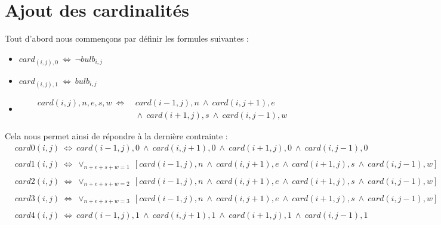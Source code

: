 \documentclass{article}
\begin{document}
\section{Ajout des cardinalit\'es}

Tout d'abord nous commen\c{c}ons par d\'efinir les formules suivantes :
\begin{itemize}
\item $ card_{(i,j),0} ~ \Leftrightarrow ~ \neg bulb_{i,j} $
\item $ card_{(i,j),1} ~ \Leftrightarrow ~ bulb_{i,j} $
\item 
\begin{align}
\nonumber card(i,j),n,e,s,w ~ \Leftrightarrow &~card(i-1,j),n ~ \wedge ~ card(i,j+1),e
\\ 
\nonumber
&~ \wedge ~ card(i+1,j),s ~ \wedge ~ card(i,j-1),w 
\end{align}
\end{itemize}
Cela nous permet ainsi de r\'epondre \`a la derni\`ere contrainte :
\begin{align}
\nonumber
&card0(i,j) ~ \Leftrightarrow ~ card(i-1,j),0 ~ \wedge ~ card(i,j+1),0~ \wedge ~ card(i+1,j),0 ~ \wedge ~ card(i,j-1),0\\
\nonumber
\\
\nonumber
&card1(i,j) ~ \Leftrightarrow ~ \vee_{n+e+s+w = 1} ~ [card(i-1,j),n ~ \wedge ~ card(i,j+1),e ~ \wedge ~ card(i+1,j),s ~ \wedge ~ card(i,j-1),w]\\
\nonumber
\\
\nonumber
&card2(i,j) ~ \Leftrightarrow ~ \vee_{n+e+s+w = 2} ~ [card(i-1,j),n ~ \wedge ~ card(i,j+1),e~ \wedge ~ card(i+1,j),s ~ \wedge ~ card(i,j-1),w]\\
\nonumber
\\
\nonumber
&card3(i,j) ~ \Leftrightarrow ~ \vee_{n+e+s+w = 3} ~ [card(i-1,j),n ~ \wedge ~ card(i,j+1),e~ \wedge ~ card(i+1,j),s ~ \wedge ~ card(i,j-1),w]\\
\nonumber
\\
\nonumber
&card4(i,j) ~ \Leftrightarrow ~ card(i-1,j),1 ~ \wedge ~ card(i,j+1),1 ~ \wedge ~ card(i+1,j),1 ~ \wedge ~ card(i,j-1),1\\
\nonumber
\end{align}
\end{document}
